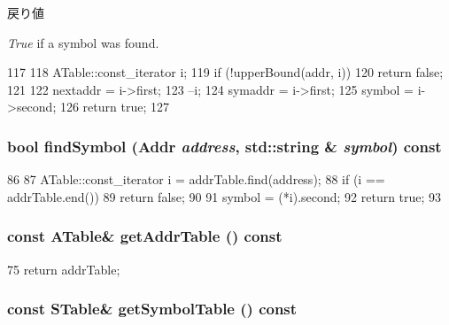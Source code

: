 \begin{DoxyRetVals}{戻り値}
\item[{\em True}]if a symbol was found. \end{DoxyRetVals}



\begin{DoxyCode}
117     {
118         ATable::const_iterator i;
119         if (!upperBound(addr, i))
120             return false;
121 
122         nextaddr = i->first;
123         --i;
124         symaddr = i->first;
125         symbol = i->second;
126         return true;
127     }
\end{DoxyCode}
\hypertarget{classSymbolTable_a4b647562ef2e4ebd101bbbd93c13bd25}{
\subsubsection[{findSymbol}]{\setlength{\rightskip}{0pt plus 5cm}bool findSymbol ({\bf Addr} {\em address}, \/  std::string \& {\em symbol}) const}}
\label{classSymbolTable_a4b647562ef2e4ebd101bbbd93c13bd25}



\begin{DoxyCode}
86     {
87         ATable::const_iterator i = addrTable.find(address);
88         if (i == addrTable.end())
89             return false;
90 
91         symbol = (*i).second;
92         return true;
93     }
\end{DoxyCode}
\hypertarget{classSymbolTable_a8f7d793012417ce9fe6e6c8e9297fccb}{
\subsubsection[{getAddrTable}]{\setlength{\rightskip}{0pt plus 5cm}const {\bf ATable}\& getAddrTable () const}}
\label{classSymbolTable_a8f7d793012417ce9fe6e6c8e9297fccb}



\begin{DoxyCode}
75 { return addrTable; }
\end{DoxyCode}
\hypertarget{classSymbolTable_aa116520a144e1e071acb011e028dcb79}{
\subsubsection[{getSymbolTable}]{\setlength{\rightskip}{0pt plus 5cm}const {\bf STable}\& getSymbolTable () const}}
\label{classSymbolTable_aa116520a144e1e071acb011e028dcb79}



